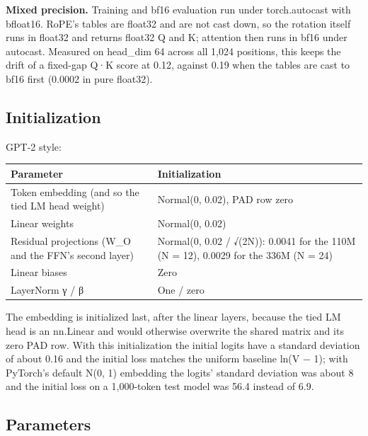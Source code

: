 \documentclass[11pt]{article}
\begin{document}
\textbf{Mixed precision.} Training and bf16 evaluation run under torch.autocast with bfloat16. RoPE's tables are float32 and are not cast down, so the rotation itself runs in float32 and returns float32 Q and K; attention then runs in bf16 under autocast. Measured on head\_\allowbreak{}dim 64 across all 1,024 positions, this keeps the drift of a fixed-gap Q·K score at 0.12, against 0.19 when the tables are cast to bf16 first (0.0002 in pure float32).

\subsection{Initialization}

GPT-2 style:

\begin{center}
\small
\begin{tabularx}{\linewidth}{>{\raggedright\arraybackslash}X>{\raggedright\arraybackslash}X}
\toprule
\textbf{Parameter} & \textbf{Initialization} \\
\midrule
Token embedding (and so the tied LM head weight) & Normal(0, 0.02), PAD row zero \\
Linear weights & Normal(0, 0.02) \\
Residual projections (W\_\allowbreak{}O and the FFN's second layer) & Normal(0, 0.02 /\allowbreak{} √(2N)): 0.0041 for the 110M (N = 12), 0.0029 for the 336M (N = 24) \\
Linear biases & Zero \\
LayerNorm γ /\allowbreak{} β & One /\allowbreak{} zero \\
\bottomrule
\end{tabularx}
\end{center}

The embedding is initialized last, after the linear layers, because the tied LM head is an nn.Linear and would otherwise overwrite the shared matrix and its zero PAD row. With this initialization the initial logits have a standard deviation of about 0.16 and the initial loss matches the uniform baseline ln(V − 1); with PyTorch's default N(0, 1) embedding the logits' standard deviation was about 8 and the initial loss on a 1,000-token test model was 56.4 instead of 6.9.

\subsection{Parameters}
\end{document}
